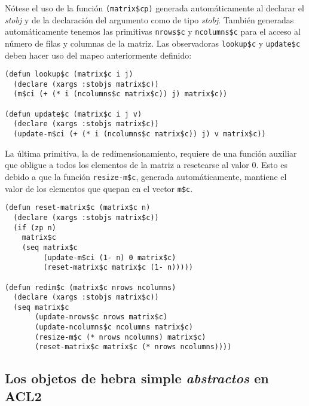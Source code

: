 \documentclass[a4paper,10pt]{article}
\begin{document}
Nótese el uso de la función \texttt{(matrix\$cp)} generada automáticamente al declarar el \emph{stobj} y de la declaración del argumento como de tipo \emph{stobj}. También generadas automáticamente tenemos las primitivas \texttt{nrows\$c} y \texttt{ncolumns\$c} para el acceso al número de filas y columnas de la matriz. Las observadoras \texttt{lookup\$c} y \texttt{update\$c} deben hacer uso del mapeo anteriormente definido:

\par \vspace{10pt}

\begin{lstlisting}[language=clips]
(defun lookup$c (matrix$c i j)
  (declare (xargs :stobjs matrix$c))
  (m$ci (+ (* i (ncolumns$c matrix$c)) j) matrix$c))
	
(defun update$c (matrix$c i j v)
  (declare (xargs :stobjs matrix$c))
  (update-m$ci (+ (* i (ncolumns$c matrix$c)) j) v matrix$c))
\end{lstlisting}

\par \vspace{10pt}

La última primitiva, la de redimensionamiento, requiere de una función auxiliar que obligue a todos los elementos de la matriz a resetearse al valor 0. Esto es debido a que la función \texttt{resize-m\$c}, generada automáticamente, mantiene el valor de los elementos que quepan en el vector \texttt{m\$c}.

\par \vspace{10pt}

\begin{lstlisting}[language=clips]
(defun reset-matrix$c (matrix$c n)
  (declare (xargs :stobjs matrix$c))
  (if (zp n)
    matrix$c
    (seq matrix$c
         (update-m$ci (1- n) 0 matrix$c)
         (reset-matrix$c matrix$c (1- n)))))
				
(defun redim$c (matrix$c nrows ncolumns)
  (declare (xargs :stobjs matrix$c))
  (seq matrix$c
       (update-nrows$c nrows matrix$c)
       (update-ncolumns$c ncolumns matrix$c)
       (resize-m$c (* nrows ncolumns) matrix$c)
       (reset-matrix$c matrix$c (* nrows ncolumns))))
\end{lstlisting}

\vspace{12pt}
\subsection{Los objetos de hebra simple \emph{abstractos} en ACL2}
\vspace{10pt}
\end{document}
